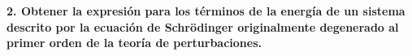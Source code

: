 \textbf{2. Obtener la expresión para los términos de la energía de un sistema descrito por la ecuación de
Schrödinger originalmente degenerado al primer orden de la teoría de perturbaciones.}\\